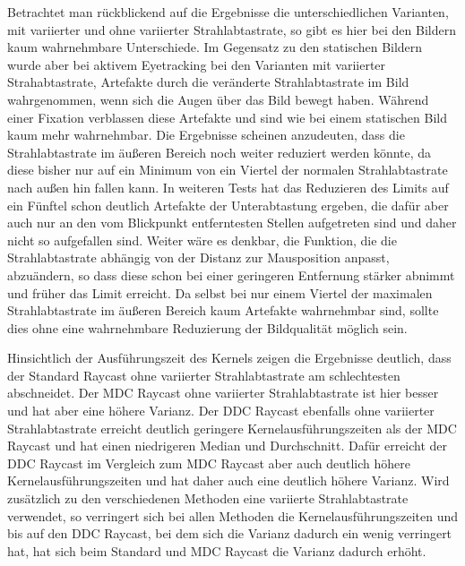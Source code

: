 Betrachtet man rückblickend auf die Ergebnisse die unterschiedlichen Varianten, mit variierter und ohne variierter Strahlabtastrate, so gibt es hier bei den Bildern kaum wahrnehmbare Unterschiede.
Im Gegensatz zu den statischen Bildern wurde aber bei aktivem Eyetracking bei den Varianten mit variierter Strahabtastrate, Artefakte durch die veränderte Strahlabtastrate im Bild wahrgenommen, wenn sich die Augen über das Bild bewegt haben.
Während einer Fixation verblassen diese Artefakte und sind wie bei einem statischen Bild kaum mehr wahrnehmbar.
Die Ergebnisse scheinen anzudeuten, dass die Strahlabtastrate im äußeren Bereich noch weiter reduziert werden könnte, da diese bisher nur auf ein Minimum von ein Viertel der normalen Strahlabtastrate nach außen hin fallen kann.
In weiteren Tests hat das Reduzieren des Limits auf ein Fünftel schon deutlich Artefakte der Unterabtastung ergeben, die dafür aber auch nur an den vom Blickpunkt entferntesten Stellen aufgetreten sind und daher nicht so aufgefallen sind.
Weiter wäre es denkbar, die Funktion, die die Strahlabtastrate abhängig von der Distanz zur Mausposition anpasst, abzuändern, so dass diese schon bei einer geringeren Entfernung stärker abnimmt und früher das Limit erreicht.
Da selbst bei nur einem Viertel der maximalen Strahlabtastrate im äußeren Bereich kaum Artefakte wahrnehmbar sind, sollte dies ohne eine wahrnehmbare Reduzierung der Bildqualität möglich sein.

Hinsichtlich der Ausführungszeit des Kernels zeigen die Ergebnisse deutlich, dass der Standard Raycast ohne variierter Strahlabtastrate am schlechtesten abschneidet.
Der MDC Raycast ohne variierter Strahlabtastrate ist hier besser und hat aber eine höhere Varianz.
Der DDC Raycast ebenfalls ohne variierter Strahlabtastrate erreicht deutlich geringere Kernelausführungszeiten als der MDC Raycast und hat einen niedrigeren Median und Durchschnitt.
Dafür erreicht der DDC Raycast im Vergleich zum MDC Raycast aber auch deutlich höhere Kernelausführungszeiten und hat daher auch eine deutlich höhere Varianz.
Wird zusätzlich zu den verschiedenen Methoden eine variierte Strahlabtastrate verwendet, so verringert sich bei allen Methoden die Kernelausführungszeiten und bis auf den DDC Raycast, bei dem sich die Varianz dadurch ein wenig verringert hat, hat sich beim Standard und MDC Raycast die Varianz dadurch erhöht.

